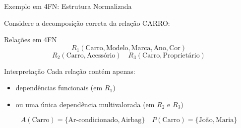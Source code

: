 \documentclass[9pt]{beamer}
\begin{document}
\begin{frame}{Exemplo em 4FN: Estrutura Normalizada}
\small

Considere a decomposição correta da relação CARRO:

\vspace{0.2cm}

\begin{block}{Relações em 4FN}
\[
R_1(\text{Carro}, \text{Modelo}, \text{Marca}, \text{Ano}, \text{Cor})
\]
\[
R_2(\text{Carro}, \text{Acessório})
\quad
R_3(\text{Carro}, \text{Proprietário})
\]
\end{block}

\vspace{0.3cm}

\begin{alertblock}{Interpretação}
Cada relação contém apenas:
\begin{itemize}
    \item dependências funcionais (em $R_1$)
    \item ou uma única dependência multivalorada (em $R_2$ e $R_3$)
\end{itemize}
\end{alertblock}

\vspace{0.3cm}

\centering
\[
A(\text{Carro}) = \{\text{Ar-condicionado}, \text{Airbag}\}
\quad
P(\text{Carro}) = \{\text{João}, \text{Maria}\}
\]

\end{frame}
\end{document}
